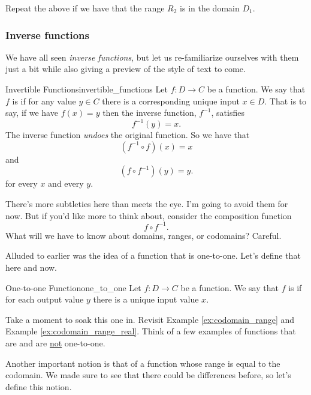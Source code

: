     \begin{exercise}
    Repeat the above if we have that the range $R_2$ is in the domain $D_1$.
    \end{exercise}
    
    \subsubsection{Inverse functions}
    
    We have all seen \emph{inverse functions}, but let us re-familiarize ourselves with them just a bit while also giving a preview of the style of text to come.
    
    \begin{df}{Invertible Functions}{invertible_functions}
    Let $f\colon D \to C$ be a function. We say that $f$ is  if for any value $y\in C$ there is a corresponding unique input $x\in D$.  That is to say, if we have $f(x)=y$ then the inverse function, $f^{-1}$, satisfies
    \[
    f^{-1}(y)=x.
    \]
    The inverse function \emph{undoes} the original function. So we have that
    \[
    (f^{-1}\circ f)(x)=x
    \]
    and
    \[
    (f\circ f^{-1})(y)=y.
    \]
    for every $x$ and every $y$.
    \end{df}
    
    \begin{remark}
    There's more subtleties here than meets the eye.  I'm going to avoid them for now.  But if you'd like more to think about, consider the composition function
    \[
    f\circ f^{-1}.
    \]
    What will we have to know about domains, ranges, or codomains? Careful.
    \end{remark}
    
    Alluded to earlier was the idea of a function that is one-to-one. Let's define that here and now.
    \begin{df}{One-to-one Function}{one_to_one}
    Let $f\colon D \to C$ be a function. We say that $f$ is  if for each output value $y$ there is a unique input value $x$.
    \end{df}
    \noindent Take a moment to soak this one in. Revisit Example \ref{ex:codomain_range} and Example \ref{ex:codomain_range_real}. Think of a few examples of functions that are and are \underline{not} one-to-one.
    
    Another important notion is that of a function whose range is equal to the codomain.  We made sure to see that there could be differences before, so let's define this notion.
    
